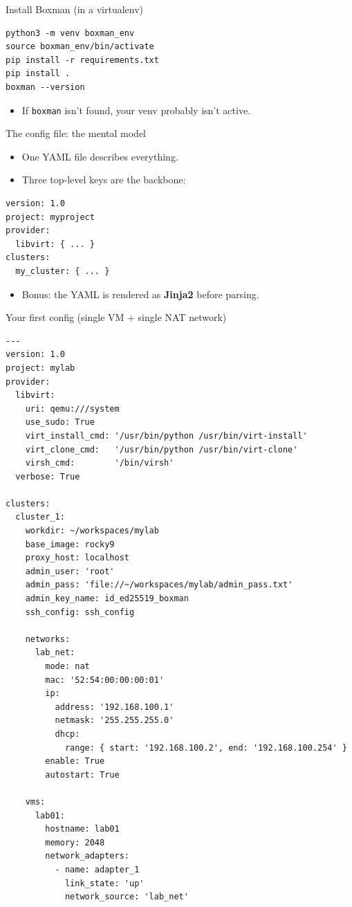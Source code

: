 \documentclass[aspectratio=169]{beamer}
\begin{document}
\begin{frame}[fragile]{Install Boxman (in a virtualenv)}
\begin{lstlisting}[style=boxman]
python3 -m venv boxman_env
source boxman_env/bin/activate
pip install -r requirements.txt
pip install .
boxman --version
\end{lstlisting}
\begin{itemize}
  \item If \texttt{boxman} isn't found, your venv probably isn't active.
\end{itemize}
\end{frame}

\begin{frame}[fragile]{The config file: the mental model}
\begin{itemize}
  \item One YAML file describes everything.
  \item Three top-level keys are the backbone:
\end{itemize}
\begin{lstlisting}[style=boxman]
version: 1.0
project: myproject
provider:
  libvirt: { ... }
clusters:
  my_cluster: { ... }
\end{lstlisting}
\vspace{0.3em}
\begin{itemize}
  \item Bonus: the YAML is rendered as \textbf{Jinja2} before parsing.
\end{itemize}
\end{frame}

\begin{frame}[fragile]{Your first config (single VM + single NAT network)}
\small
\begin{lstlisting}[style=boxman]
---
version: 1.0
project: mylab
provider:
  libvirt:
    uri: qemu:///system
    use_sudo: True
    virt_install_cmd: '/usr/bin/python /usr/bin/virt-install'
    virt_clone_cmd:   '/usr/bin/python /usr/bin/virt-clone'
    virsh_cmd:        '/bin/virsh'
  verbose: True

clusters:
  cluster_1:
    workdir: ~/workspaces/mylab
    base_image: rocky9
    proxy_host: localhost
    admin_user: 'root'
    admin_pass: 'file://~/workspaces/mylab/admin_pass.txt'
    admin_key_name: id_ed25519_boxman
    ssh_config: ssh_config

    networks:
      lab_net:
        mode: nat
        mac: '52:54:00:00:00:01'
        ip:
          address: '192.168.100.1'
          netmask: '255.255.255.0'
          dhcp:
            range: { start: '192.168.100.2', end: '192.168.100.254' }
        enable: True
        autostart: True

    vms:
      lab01:
        hostname: lab01
        memory: 2048
        network_adapters:
          - name: adapter_1
            link_state: 'up'
            network_source: 'lab_net'
\end{lstlisting}
\end{frame}
\end{document}
